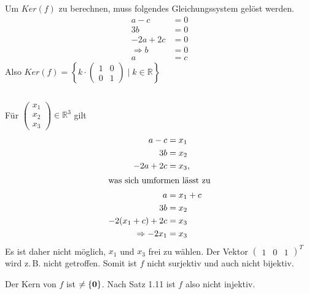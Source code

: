 \documentclass{../mfa}
\begin{document}
\subsection{}
Um $Ker(f)$ zu berechnen, muss folgendes Gleichungssystem gelöst werden.
\begin{align*}
   a - c    & = 0 \\
   3b       & = 0 \\
   -2a + 2c & = 0 \\
   \Rightarrow b &= 0 \\
   a &= c
\end{align*}
Also $Ker(f) = \left\{k \cdot \begin{pmatrix} 1 & 0 \\ 0 & 1 \end{pmatrix} \mid k \in \mathbb{R} \right\}$

\subsection{}

Für $\begin{pmatrix} x_1 \\ x_2 \\ x_3 \end{pmatrix}\in \mathbb{R}^3$ gilt 
\begin{align*}
   a - c                                  & = x_1 \\
   3b                                     & = x_2 \\
   -2a + 2c                               & = x_3, \\
   \intertext{was sich umformen lässt zu}
   a                                      & = x_1 + c \\
   3b                                     & = x_2 \\
   -2(x_1 + c) + 2c                       & = x_3 \\
   \Rightarrow -2x_1                      & = x_3
\end{align*}
Es ist daher nicht möglich, $x_1$ und $x_3$ frei zu wählen. Der Vektor
$\begin{pmatrix} 1 & 0 & 1 \end{pmatrix}^T$ wird z.\,B. nicht getroffen. Somit
ist $f$ nicht surjektiv und auch nicht bijektiv.

Der Kern von $f$ ist $\neq \{\mathbf{0}\}$. Nach Satz 1.11 ist $f$ also nicht injektiv.
\end{document}

